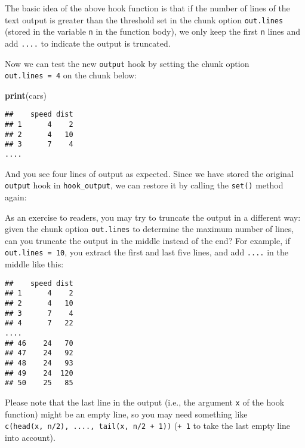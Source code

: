\documentclass[
  11pt,
]{krantz}
\newenvironment{Shaded}{\begin{snugshade}}{\end{snugshade}}
\newcommand{\DataTypeTok}[1]{\textcolor[rgb]{0.27,0.27,0.27}{#1}}
\newcommand{\KeywordTok}[1]{\textcolor[rgb]{0.27,0.27,0.27}{\textbf{#1}}}
\newcommand{\NormalTok}[1]{#1}
\newcommand{\OperatorTok}[1]{\textcolor[rgb]{0.43,0.43,0.43}{\textbf{#1}}}
\begin{document}
The basic idea of the above hook function is that if the number of lines of the text output is greater than the threshold set in the chunk option \texttt{out.lines} (stored in the variable \texttt{n} in the function body), we only keep the first \texttt{n} lines and add \texttt{....} to indicate the output is truncated.

Now we can test the new \texttt{output} hook by setting the chunk option \texttt{out.lines\ =\ 4} on the chunk below:

\begin{Shaded}
\begin{Highlighting}[]
\KeywordTok{print}\NormalTok{(cars)}
\end{Highlighting}
\end{Shaded}

\begin{verbatim}
##    speed dist
## 1      4    2
## 2      4   10
## 3      7    4
....
\end{verbatim}

And you see four lines of output as expected. Since we have stored the original \texttt{output} hook in \texttt{hook\_output}, we can restore it by calling the \texttt{set()} method again:

\begin{Shaded}
\end{Shaded}

As an exercise to readers, you may try to truncate the output in a different way: given the chunk option \texttt{out.lines} to determine the maximum number of lines, can you truncate the output in the middle instead of the end? For example, if \texttt{out.lines\ =\ 10}, you extract the first and last five lines, and add \texttt{....} in the middle like this:

\begin{verbatim}
##    speed dist
## 1      4    2
## 2      4   10
## 3      7    4
## 4      7   22
....
## 46    24   70
## 47    24   92
## 48    24   93
## 49    24  120
## 50    25   85
\end{verbatim}

Please note that the last line in the output (i.e., the argument \texttt{x} of the hook function) might be an empty line, so you may need something like \texttt{c(head(x,\ n/2),\ \textquotesingle{}....\textquotesingle{},\ tail(x,\ n/2\ +\ 1))} (\texttt{+\ 1} to take the last empty line into account).
\end{document}
